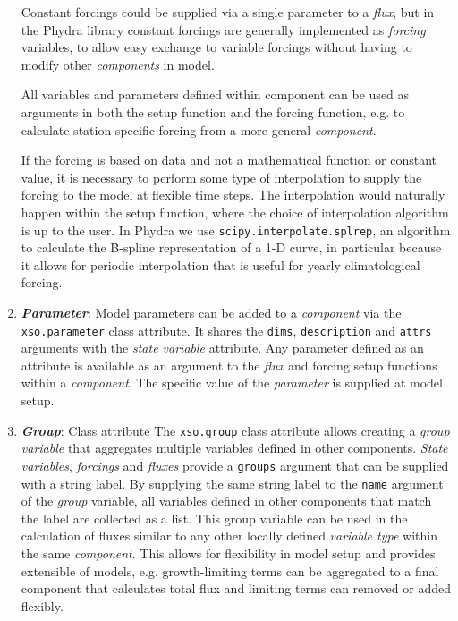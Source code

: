 \documentclass[journal abbreviation, manuscript]{copernicus}
\begin{document}
\begin{enumerate}
    Constant forcings could be supplied via a single parameter to a \textit{flux}, but in the Phydra library constant forcings are generally implemented as \textit{forcing} variables, to allow easy exchange to variable forcings without having to modify other \textit{components} in model. 

    All variables and parameters defined within component can be used as arguments in both the setup function and the forcing function, e.g. to calculate station-specific forcing from a more general \textit{component}.
    
    If the forcing is based on data and not a mathematical function or constant value, it is necessary to perform some type of interpolation to supply the forcing to the model at flexible time steps. The interpolation would naturally happen within the setup function, where the choice of interpolation algorithm is up to the user. In Phydra we use \texttt{scipy.interpolate.splrep}, an algorithm to calculate the B-spline representation of a 1-D curve, in particular because it allows for periodic interpolation that is useful for yearly climatological forcing.
    
    \item \textbf{\textit{Parameter}}: 
    Model parameters can be added to a \textit{component} via the \texttt{xso.parameter} class attribute. It shares the \texttt{dims}, \texttt{description} and \texttt{attrs} arguments with the \textit{state variable} attribute. Any parameter defined as an attribute is available as an argument to the \textit{flux} and forcing setup functions within a \textit{component}. The specific value of the \textit{parameter} is supplied at model setup.
    
    \item \textbf{\textit{Group}}: Class attribute
    The \texttt{xso.group} class attribute allows creating a \textit{group variable} that aggregates multiple variables defined in other components. \textit{State variables}, \textit{forcings} and \textit{fluxes} provide a \texttt{groups} argument that can be supplied with a string label. By supplying the same string label to the \texttt{name} argument of the \textit{group} variable, all variables defined in other components that match the label are collected as a list. 
    This group variable can be used in the calculation of fluxes similar to any other locally defined \textit{variable type} within the same \textit{component}. This allows for flexibility in model setup and provides extensible of models, e.g. growth-limiting terms can be aggregated to a final component that calculates total flux and limiting terms can removed or added flexibly.
    

\end{enumerate}
\end{document}
